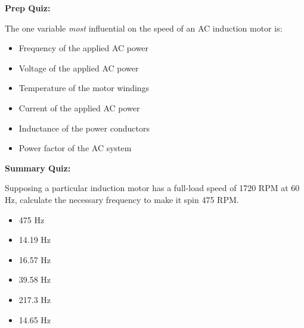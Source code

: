 \vfil \eject

\noindent
{\bf Prep Quiz:}

The one variable {\it most} influential on the speed of an AC induction motor is:

\begin{itemize}
\item{} Frequency of the applied AC power
\vskip 5pt 
\item{} Voltage of the applied AC power
\vskip 5pt 
\item{} Temperature of the motor windings
\vskip 5pt 
\item{} Current of the applied AC power
\vskip 5pt 
\item{} Inductance of the power conductors
\vskip 5pt 
\item{} Power factor of the AC system
\end{itemize}


\vfil \eject

\noindent
{\bf Summary Quiz:}

Supposing a particular induction motor has a full-load speed of 1720 RPM at 60 Hz, calculate the necessary frequency to make it spin 475 RPM.

\begin{itemize}
\item{} 475 Hz
\vskip 5pt 
\item{} 14.19 Hz
\vskip 5pt 
\item{} 16.57 Hz
\vskip 5pt 
\item{} 39.58 Hz
\vskip 5pt 
\item{} 217.3 Hz
\vskip 5pt 
\item{} 14.65 Hz
\end{itemize}



